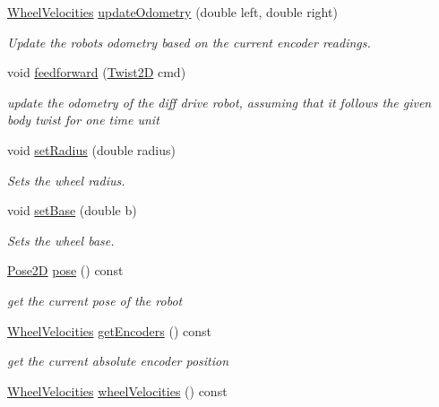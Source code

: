 \begin{DoxyCompactItemize}
\hyperlink{structrigid2d_1_1WheelVelocities}{Wheel\+Velocities} \hyperlink{classrigid2d_1_1DiffDrive_aa037844753d585eca7023bfd935e084b}{update\+Odometry} (double left, double right)
\begin{DoxyCompactList}\small\item\em Update the robot\textquotesingle{}s odometry based on the current encoder readings. \end{DoxyCompactList}\item 
void \hyperlink{classrigid2d_1_1DiffDrive_a09e8b9b8fe6539b75bb08f1b71242b7c}{feedforward} (\hyperlink{structrigid2d_1_1Twist2D}{Twist2D} cmd)
\begin{DoxyCompactList}\small\item\em update the odometry of the diff drive robot, assuming that it follows the given body twist for one time unit \end{DoxyCompactList}\item 
void \hyperlink{classrigid2d_1_1DiffDrive_adc465e5cf9027ffb207a3775800d2033}{set\+Radius} (double radius)
\begin{DoxyCompactList}\small\item\em Sets the wheel radius. \end{DoxyCompactList}\item 
void \hyperlink{classrigid2d_1_1DiffDrive_aed9b82741312243d9ea1f705afc372dc}{set\+Base} (double b)
\begin{DoxyCompactList}\small\item\em Sets the wheel base. \end{DoxyCompactList}\item 
\hyperlink{structrigid2d_1_1Pose2D}{Pose2D} \hyperlink{classrigid2d_1_1DiffDrive_a3af583df8981ddfb338bba07b7297ff2}{pose} () const
\begin{DoxyCompactList}\small\item\em get the current pose of the robot \end{DoxyCompactList}\item 
\hyperlink{structrigid2d_1_1WheelVelocities}{Wheel\+Velocities} \hyperlink{classrigid2d_1_1DiffDrive_add7b4cb6d5e4edaffdcefbfa930a2f43}{get\+Encoders} () const
\begin{DoxyCompactList}\small\item\em get the current absolute encoder position \end{DoxyCompactList}\item 
\hyperlink{structrigid2d_1_1WheelVelocities}{Wheel\+Velocities} \hyperlink{classrigid2d_1_1DiffDrive_a4153bdc614be0535b88d5e43461df7dc}{wheel\+Velocities} () const

\end{DoxyCompactItemize}
